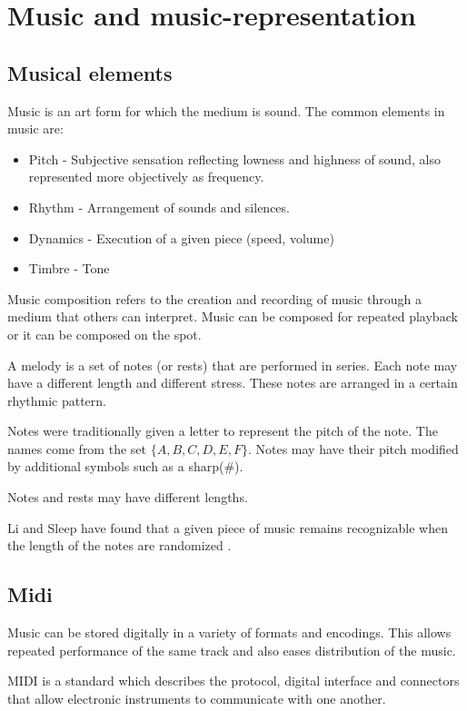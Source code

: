 \chapter{Music and music-representation}\label{ch:introduction}
\section{Musical elements}
Music is an art form for which the medium is sound.
The common elements in music are:
\begin{itemize}
\item Pitch - Subjective sensation reflecting lowness and highness of sound, also represented more objectively as frequency.
\item Rhythm - Arrangement of sounds and silences.
\item Dynamics - Execution of a given piece (speed, volume)
\item Timbre - Tone
\end{itemize}

Music composition refers to the creation and recording of music through a medium that others can interpret.  Music can be composed for repeated playback or it can be composed on the spot.

A melody is a set of notes (or rests) that are performed in series. Each note may have a different length and different stress. These notes are arranged in a certain rhythmic pattern.

Notes were traditionally given a letter to represent the pitch of the note. The names come from the set $\{A, B, C, D, E, F\}$. Notes may have their pitch modified by additional symbols such as a sharp($\#$).

Notes and rests may have different lengths.


Li and Sleep have found that a given piece of music remains recognizable when the length of the notes are randomized \cite{Ling2004}.

\section{Midi}
Music can be stored digitally in a variety of formats and encodings. This allows repeated performance of the same track and also eases distribution of the music.

\ac{MIDI} is a standard which describes the protocol, digital interface and connectors that allow electronic instruments to communicate with one another.

